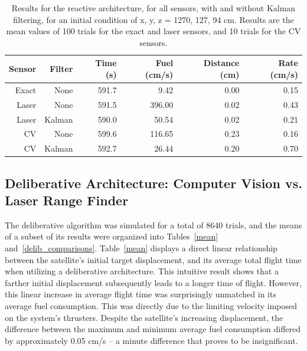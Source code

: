 \documentclass[journal, 10pt]{IEEEtran}
\begin{document}
\begin{table}
\centering
\normalsize
\caption{\label{react_comparisons}Results for the reactive architecture, for all sensors, with and without Kalman filtering, for an initial condition of x, y, z = 1270, 127, 94 cm. Results are the mean values of 100 trials for the exact and laser sensors, and 10 trials for the CV sensors.}
\begin{tabular}{r r | r r r r }
\toprule
Sensor & Filter & Time (s) & Fuel (cm/s) & Distance (cm) & Rate (cm/s) \\
\midrule
 Exact &   None &    591.7 &        9.42 &          0.00 &        0.15 \\
 Laser &   None &    591.5 &      396.00 &          0.02 &        0.43 \\
 Laser & Kalman &    590.0 &       50.54 &          0.02 &        0.21 \\
    CV &   None &    599.6 &      116.65 &          0.23 &        0.16 \\
    CV & Kalman &    592.7 &       26.44 &          0.20 &        0.70 \\
\bottomrule
\end{tabular}
\end{table}

\subsection{Deliberative Architecture: Computer Vision vs. Laser Range Finder}
The deliberative algorithm was simulated for a total of 8640 trials, and the means of a subset of its results were organized into Tables~\ref{mean} and~\ref{delib_comparisons}. Table~\ref{mean} displays a direct linear relationship between the satellite's initial target displacement, and its average total flight time when utilizing a deliberative architecture. This intuitive result shows that a farther initial displacement subsequently leads to a longer time of flight. However, this linear increase in average flight time was surprisingly unmatched in its average fuel consumption. This was directly due to the limiting velocity imposed on the system's thrusters. Despite the satellite's increasing displacement, the difference between the maximum and minimum average fuel consumption differed by approximately 0.05 cm/s -- a minute difference that proves to be insignificant.
\end{document}
